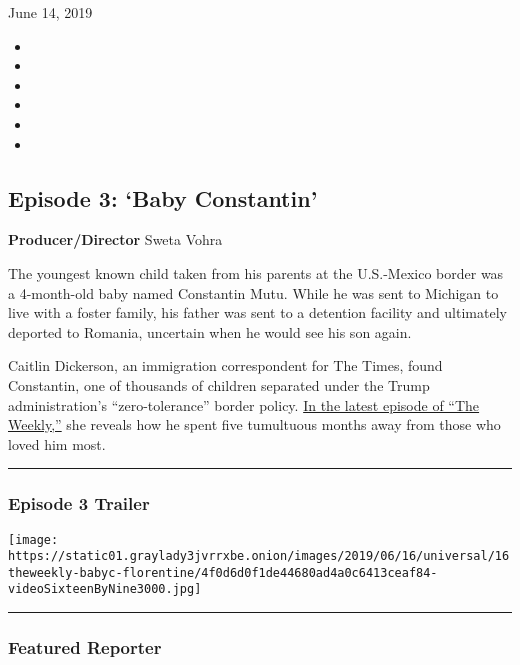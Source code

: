 June 14, 2019

\begin{itemize}
\item
\item
\item
\item
\item
\item
\end{itemize}

\hypertarget{episode-3-baby-constantin}{%
\subsection{Episode 3: `Baby
Constantin'}\label{episode-3-baby-constantin}}

\textbf{Producer/Director} Sweta Vohra

The youngest known child taken from his parents at the U.S.-Mexico
border was a 4-month-old baby named Constantin Mutu. While he was sent
to Michigan to live with a foster family, his father was sent to a
detention facility and ultimately deported to Romania, uncertain when he
would see his son again.

Caitlin Dickerson, an immigration correspondent for The Times, found
Constantin, one of thousands of children separated under the Trump
administration's ``zero-tolerance'' border policy.
\href{https://www.hulu.com/watch/3ce1b4ba-f32d-4a72-8406-40ab36e48bef}{In
the latest episode of ``The Weekly,''} she reveals how he spent five
tumultuous months away from those who loved him most.

\begin{center}\rule{0.5\linewidth}{\linethickness}\end{center}

\hypertarget{episode-3-trailer}{%
\subsubsection{Episode 3 Trailer}\label{episode-3-trailer}}

\texttt{[image: https://static01.graylady3jvrrxbe.onion/images/2019/06/16/universal/16theweekly-babyc-florentine/4f0d6d0f1de44680ad4a0c6413ceaf84-videoSixteenByNine3000.jpg]}

\begin{center}\rule{0.5\linewidth}{\linethickness}\end{center}

\hypertarget{featured-reporter}{%
\subsubsection{Featured Reporter}\label{featured-reporter}}

